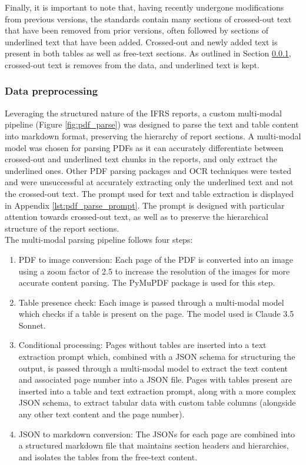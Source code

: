 Finally, it is important to note that, having recently undergone modifications from previous versions, the standards contain many sections of crossed-out text that have been removed from prior versions, often followed by sections of underlined text that have been added. Crossed-out and newly added text is present in both tables as well as free-text sections. As outlined in Section \ref{data_processing}, crossed-out text is removes from the data, and underlined text is kept.

\subsubsection{Data preprocessing} \label{data_processing}

Leveraging the structured nature of the IFRS reports, a custom multi-modal pipeline (Figure \ref{fig:pdf_parse}) was designed to parse the text and table content into markdown format, preserving the hierarchy of report sections. A multi-modal model was chosen for parsing PDFs as it can accurately differentiate between crossed-out and underlined text chunks in the reports, and only extract the underlined ones. Other PDF parsing packages and OCR techniques were tested and were unsuccessful at accurately extracting only the underlined text and not the crossed-out text. The prompt used for text and table extraction is displayed in Appendix \ref{lst:pdf_parse_prompt}. The prompt is designed with particular attention towards crossed-out text, as well as to preserve the hierarchical structure of the report sections. \\

The multi-modal parsing pipeline follows four steps:

\begin{enumerate}
    \item PDF to image conversion: Each page of the PDF is converted into an image using a zoom factor of 2.5 to increase the resolution of the images for more accurate content parsing. The PyMuPDF package is used for this step.
    \item Table presence check: Each image is passed through a multi-modal model which checks if a table is present on the page. The model used is Claude 3.5 Sonnet.
    \item Conditional processing: Pages without tables are inserted into a text extraction prompt which, combined with a JSON schema for structuring the output, is passed through a multi-modal model to extract the text content and associated page number into a JSON file. Pages with tables present are inserted into a table and text extraction prompt, along with a more complex JSON schema, to extract tabular data with custom table columns (alongside any other text content and the page number). 
    \item JSON to markdown conversion: The JSONs for each page are combined into a structured markdown file that maintains section headers and hierarchies, and isolates the tables from the free-text content.
\end{enumerate}

